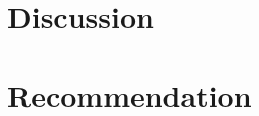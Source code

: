 \documentclass[11pt]{article}
\begin{document}





\section*{Discussion}





\section*{Recommendation}
\end{document}

